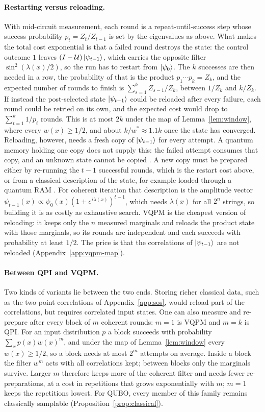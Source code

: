 \paragraph{Restarting versus reloading.} With mid-circuit measurement, each round is a repeat-until-success step whose success probability $p_t=Z_t/Z_{t-1}$ is set by the eigenvalues as above. What makes the total cost exponential is that a failed round destroys the state: the control outcome $1$ leaves $(I-\mathcal{U})\left|\psi_{t-1}\right\rangle$, which carries the opposite filter $\sin^2(\lambda(x)/2)$, so the run has to restart from $\left|\psi_0\right\rangle$. The $k$ successes are then needed in a row, the probability of that is the product $p_1\cdots p_k=Z_k$, and the expected number of rounds to finish is $\sum_{s=1}^{k}Z_{s-1}/Z_k$, between $1/Z_k$ and $k/Z_k$. If instead the post-selected state $\left|\psi_{t-1}\right\rangle$ could be reloaded after every failure, each round could be retried on its own, and the expected cost would drop to $\sum_{t=1}^{k}1/p_t$ rounds. This is at most $2k$ under the map of Lemma~\ref{lem:window}, where every $w(x)\ge1/2$, and about $k/w^*\approx1.1k$ once the state has converged. Reloading, however, needs a fresh copy of $\left|\psi_{t-1}\right\rangle$ for every attempt. A quantum memory holding one copy does not supply this: the failed attempt consumes that copy, and an unknown state cannot be copied \cite{wootters1982single}. A new copy must be prepared either by re-running the $t-1$ successful rounds, which is the restart cost above, or from a classical description of the state, for example loaded through a quantum RAM \cite{giovannetti2008quantum}. For coherent iteration that description is the amplitude vector $\psi_{t-1}(x)\propto\psi_0(x)(1+e^{i\lambda(x)})^{t-1}$, which needs $\lambda(x)$ for all $2^n$ strings, so building it is as costly as exhaustive search. VQPM is the cheapest version of reloading: it keeps only the $n$ measured marginals and reloads the product state with those marginals, so its rounds are independent and each succeeds with probability at least $1/2$. The price is that the correlations of $\left|\psi_{t-1}\right\rangle$ are not reloaded (Appendix~\ref{app:vqpm-map}).

\paragraph{Between QPI and VQPM.} Two kinds of variants lie between the two ends. Storing richer classical data, such as the two-point correlations of Appendix~\ref{app:sos}, would reload part of the correlations, but requires correlated input states. One can also measure and re-prepare after every block of $m$ coherent rounds: $m=1$ is VQPM and $m=k$ is QPI. For an input distribution $p$ a block succeeds with probability $\sum_xp(x)w(x)^m$, and under the map of Lemma~\ref{lem:window} every $w(x)\ge1/2$, so a block needs at most $2^m$ attempts on average. Inside a block the filter $w^m$ acts with all correlations kept; between blocks only the marginals survive. Larger $m$ therefore keeps more of the coherent filter and needs fewer re-preparations, at a cost in repetitions that grows exponentially with $m$; $m=1$ keeps the repetitions lowest. For QUBO, every member of this family remains classically samplable (Proposition~\ref{prop:classical}).

